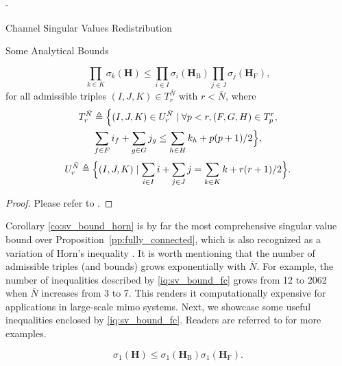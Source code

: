 \begin{section}{-}
\begin{subsection}{Channel Singular Values Redistribution}
\begin{subsubsection}{Some Analytical Bounds}
			\begin{corollary}
				\begin{equation}
					\prod_{k \in {K}} \sigma_k(\mathbf{H}) \le \prod_{i \in {I}} \sigma_i(\mathbf{H}_\mathrm{B}) \prod_{j \in {J}} \sigma_j(\mathbf{H}_\mathrm{F}),
					\label{iq:sv_bound_fc}
				\end{equation}
				for all admissible triples $(I, J, K) \in T_r^{\bar{N}}$ with $r < \bar{N}$, where
				\begin{equation*}
					\begin{gathered}
						T_r^{\bar{N}} \triangleq \Bigl\{(I, J, K) \in U_r^{\bar{N}} \mid \forall p < r, (F, G, H) \in T_p^r,\\
						\sum_{f \in F} i_f + \sum_{g \in G} j_g \le \sum_{h \in H} k_h + p(p+1)/2 \Bigr\},
					\end{gathered}
				\end{equation*}
				\begin{equation*}
					U_r^{\bar{N}} \triangleq \Bigl\{(I, J, K) \mid \sum_{i \in I} i + \sum_{j \in J} j = \sum_{k \in K} k + r(r+1)/2\Bigr\}.
				\end{equation*}
			\end{corollary}

			\begin{proof}
				Please refer to \cite[Theorem~8]{Fulton2000}.
			\end{proof}

			Corollary \eqref{co:sv_bound_horn} is by far the most comprehensive singular value bound over Proposition~\ref{pp:fully_connected}, which is also recognized as a variation of Horn's inequality \cite{Bhatia2001}.
			It is worth mentioning that the number of admissible triples (and bounds) grows exponentially with $\bar{N}$.
			For example, the number of inequalities described by \eqref{iq:sv_bound_fc} grows from 12 to 2062 when $\bar{N}$ increases from 3 to 7.
			This renders it computationally expensive for applications in large-scale \gls{mimo} systems.
			Next, we showcase some useful inequalities enclosed by \eqref{iq:sv_bound_fc}.
			Readers are referred to \cite[Chapter 16, 24]{Hogben2013} for more examples.

			\begin{corollary}
				\begin{equation}
					\sigma_1(\mathbf{H}) \le \sigma_1(\mathbf{H}_\mathrm{B}) \sigma_1(\mathbf{H}_\mathrm{F}).
				\end{equation}
			\end{corollary}


\end{subsubsection}
\end{subsection}
\end{section}
